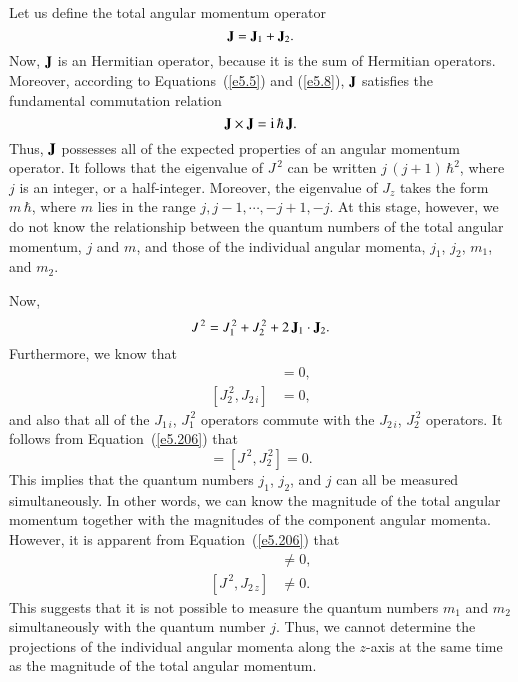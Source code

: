 Let us define the total angular momentum operator
\begin{equation}
{\bf J} = {\bf J}_1 + {\bf J}_2.
\end{equation}
Now,  ${\bf J}$ is an Hermitian operator, because it is the sum of Hermitian operators. 
Moreover, according to Equations~(\ref{e5.5}) and (\ref{e5.8}), ${\bf J}$ satisfies the fundamental commutation
relation
\begin{equation}
{\bf J} \times {\bf J} = {\rm i}\,\hbar\, {\bf J}.
\end{equation}
Thus, ${\bf J}$ possesses all of the expected properties of an
angular momentum operator. It follows that the eigenvalue of $J^{\,2}$ can be
written $j\,(j+1)\,\hbar^2$, where $j$ is an integer, or a half-integer. Moreover, the eigenvalue
of $J_z$ takes the form $m\,\hbar$, where $m$ lies in the range $j, j-1,\cdots,
-j+1, -j$. At this stage, however, we do not know the relationship between the quantum
numbers of the total angular momentum, $j$ and $m$, and those of the
individual angular momenta, $j_1$, $j_2$, $m_1$, and $m_2$. 

Now,
\begin{equation}\label{e5.206}
J^{\,2} = J_1^{\,2} + J_2^{\,2} + 2\,{\bf J}_1  \cdot {\bf J}_2.
\end{equation}
Furthermore, we know that
\begin{align}
[J_1^{\,2}, J_{1\,i} ] &= 0,\\[0.5ex]
[J_2^{\,2}, J_{2\,i} ] &= 0,
\end{align}
and also that all of the $J_{1\,i}$,  $J_1^{\,2}$ operators commute with the $J_{2\,i}$, $J_2^{\,2}$ operators. 
It follows from Equation~(\ref{e5.206}) that
\begin{equation}
[J^{\,2}, J_1^{\,2}] = [J^{\,2}, J_2^{\,2}] = 0.
\end{equation}
This implies  that the quantum numbers $j_1$, $j_2$, and $j$ can all be measured
simultaneously. In other words, we can know the magnitude of the total
angular momentum  together with the magnitudes of the component
angular momenta. However, it is apparent from Equation~(\ref{e5.206})
that
\begin{align}
[J^{\,2}, J_{1\,z}] &\neq 0,\\[0.5ex]
[J^{\,2}, J_{2\,z}] &\neq  0.
\end{align}
This suggests  that it is not possible to measure the quantum numbers $m_1$ and $m_2$
simultaneously with the quantum number $j$. Thus, we cannot determine
the projections of the individual angular momenta along the $z$-axis
at the same time as the magnitude of the total angular momentum.

